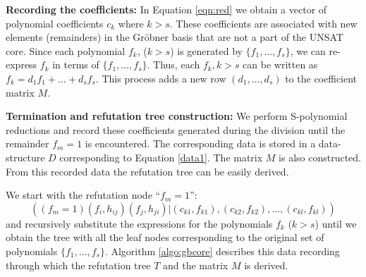 {\bf Recording the coefficients:} In Equation \ref{eqn:red} we obtain a
vector of polynomial coefficients $c_k$ where $k>s$. These
coefficients are associated with new elements (remainders) in the
Gr\"obner basis that are not a part of the UNSAT core. 
Since each polynomial $f_k$, ($k>s$) is generated by
$\{f_1,\dots,f_s\}$, we can re-express $f_k$ in terms of $\{f_1,\dots,
f_s\}$. Thus, each $f_k, k>s$ can be written as $f_k = d_1f_1 + \dots
+ d_sf_s$. This process adds a new row $(d_1,\dots,d_s)$ to the
coefficient matrix $M$. 



{\bf Termination and refutation tree construction:} We perform
S-polynomial reductions and record these coefficients  generated
during the division until the remainder $f_m = 1$ is encountered. The
corresponding data is stored in a data-structure $D$ corresponding to
Equation \ref{data1}. The matrix $M$ is also constructed. From this
recorded data the refutation tree can be easily derived. 

We start with the refutation node ``$f_m=1$'':
\begin{displaymath}
((f_{m}=1)(f_{i},h_{ij})(f_{j},h_{ji})| (c_{k1},f_{k1}),(c_{k2},f_{k2}),\dots,(c_{kl},f_{kl}))
\end{displaymath}
and recursively substitute the expressions for the polynomials $f_k$
($k>s$) until we obtain the tree with all the leaf nodes corresponding
to the original set of polynomials $\{f_1,\dots,f_s\}$. Algorithm
\ref{algo:gbcore} describes this data recording through which the
refutation tree $T$ and the matrix $M$ is derived. 

